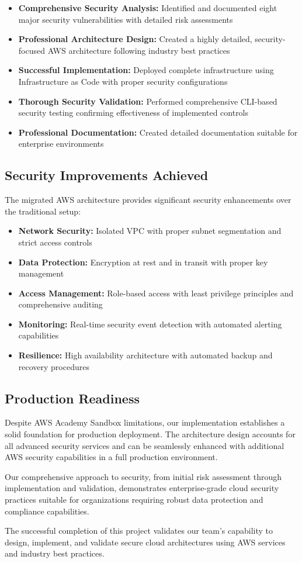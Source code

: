 \documentclass[12pt]{article}
\begin{document}
\begin{itemize}
\item \textbf{Comprehensive Security Analysis:} Identified and documented eight major security vulnerabilities with detailed risk assessments
\item \textbf{Professional Architecture Design:} Created a highly detailed, security-focused AWS architecture following industry best practices
\item \textbf{Successful Implementation:} Deployed complete infrastructure using Infrastructure as Code with proper security configurations
\item \textbf{Thorough Security Validation:} Performed comprehensive CLI-based security testing confirming effectiveness of implemented controls
\item \textbf{Professional Documentation:} Created detailed documentation suitable for enterprise environments
\end{itemize}

\subsection{Security Improvements Achieved}

The migrated AWS architecture provides significant security enhancements over the traditional setup:

\begin{itemize}
\item \textbf{Network Security:} Isolated VPC with proper subnet segmentation and strict access controls
\item \textbf{Data Protection:} Encryption at rest and in transit with proper key management
\item \textbf{Access Management:} Role-based access with least privilege principles and comprehensive auditing
\item \textbf{Monitoring:} Real-time security event detection with automated alerting capabilities
\item \textbf{Resilience:} High availability architecture with automated backup and recovery procedures
\end{itemize}

\subsection{Production Readiness}

Despite AWS Academy Sandbox limitations, our implementation establishes a solid foundation for production deployment. The architecture design accounts for all advanced security services and can be seamlessly enhanced with additional AWS security capabilities in a full production environment.

Our comprehensive approach to security, from initial risk assessment through implementation and validation, demonstrates enterprise-grade cloud security practices suitable for organizations requiring robust data protection and compliance capabilities.

The successful completion of this project validates our team's capability to design, implement, and validate secure cloud architectures using AWS services and industry best practices.
\end{document}
